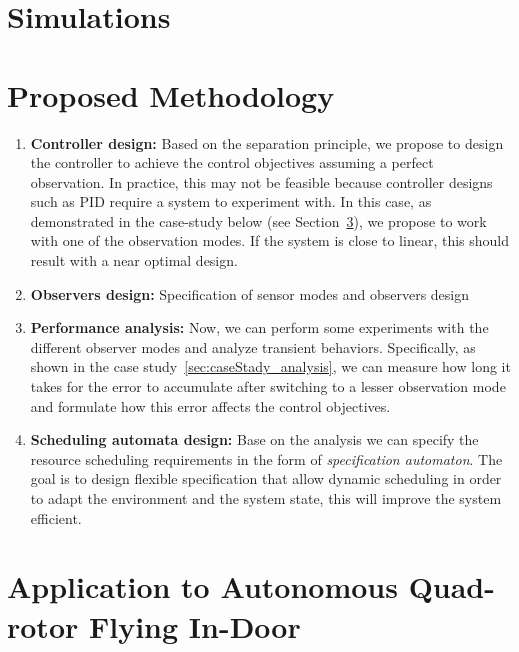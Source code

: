 \documentclass{sig-alternate-ipsn13}
\begin{document}
\section{Simulations}
\label{sec:simulation}

\section{Proposed Methodology}
\begin{enumerate}
    
    \item \textbf{Controller design:} Based on the separation principle, we propose to design the controller to achieve the control objectives assuming a perfect observation. In practice, this may not be feasible because controller designs such as PID require a system to experiment with. In this case, as demonstrated in the case-study below (see Section~\ref{sec:caseStady}), we propose to work with one of the observation modes. If the system is close to linear, this should result with a near optimal design.
    
    \item \textbf{Observers design:} Specification of sensor modes and observers design
    
    \item \textbf{Performance analysis:} Now, we can perform some experiments with the different observer modes and analyze transient behaviors. Specifically, as shown in the case study~\ref{sec:caseStady_analysis}, we can measure how long it takes for the error to accumulate after switching to a lesser observation mode and formulate how this error affects the control objectives.

    \item \textbf{Scheduling automata design:} Base on the analysis we can specify the resource scheduling requirements in the form of \textit{specification automaton}. The goal is to design flexible specification that allow dynamic scheduling in order to adapt the environment and the system state, this will improve the system efficient.

\end{enumerate}


\section{Application to Autonomous Quad-rotor Flying In-Door}
\label{sec:caseStady}
\end{document}

